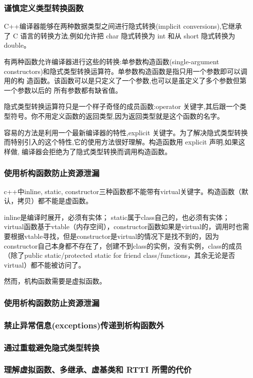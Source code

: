 \subsubsection{谨慎定义类型转换函数}
C++编译器能够在两种数据类型之间进行隐式转换(implicit conversions),它继承 了 C 语言的转换方法,例如允许把 char 隐式转换为 int 和从 short 隐式转换为 double。

有两种函数允许编译器进行这些的转换:单参数构造函数(single-argument constructors)和隐式类型转换运算符。单参数构造函数是指只用一个参数即可以调用的构 造函数。该函数可以是只定义了一个参数,也可以是虽定义了多个参数但第一个参数以后的 所有参数都有缺省值。

隐式类型转换运算符只是一个样子奇怪的成员函数:operator 关键字,其后跟一个类
型符号。你不用定义函数的返回类型,因为返回类型就是这个函数的名字。

容易的方法是利用一个最新编译器的特性,explicit 关键字。为了解决隐式类型转换 而特别引入的这个特性,它的使用方法很好理解。构造函数用 explicit 声明,如果这样做, 编译器会拒绝为了隐式类型转换而调用构造函数。

\subsubsection{使用析构函数防止资源泄漏}
c++中inline, static, constructor三种函数都不能带有virtual关键字。构造函数（默认，拷贝）都不能是虚函数。

inline是编译时展开，必须有实体；
static属于class自己的，也必须有实体；
virtual函数基于vtable（内存空间），constructor函数如果是virtual的，调用时也需要根据vtable寻找，但是constructor是virtual的情况下是找不到的，因为constructor自己本身都不存在了，创建不到class的实例，没有实例，class的成员（除了public static/protected static for friend class/functions，其余无论是否virtual）都不能被访问了。

然而，机构函数需要是虚拟函数。

\subsubsection{使用析构函数防止资源泄漏}
\subsubsection{禁止异常信息(exceptions)传递到析构函数外}
\subsubsection{通过重载避免隐式类型转换}
\subsubsection{理解虚拟函数、多继承、虚基类和 RTTI 所需的代价}
